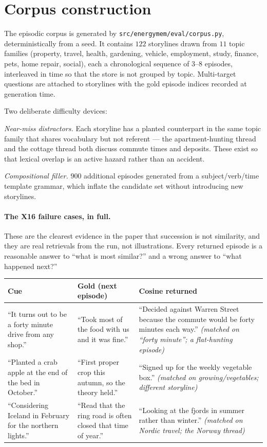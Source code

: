 \section{Corpus construction}
\label{app:corpus}

The episodic corpus is generated by \texttt{src/energymem/eval/corpus.py}, deterministically
from a seed. It contains $122$ storylines drawn from $11$ topic families (property, travel,
health, gardening, vehicle, employment, study, finance, pets, home repair, social), each a
chronological sequence of $3$--$8$ episodes, interleaved in time so that the store is not
grouped by topic. Multi-target questions are attached to storylines with the gold episode
indices recorded at generation time.

Two deliberate difficulty devices:

\emph{Near-miss distractors.} Each storyline has a planted counterpart in the same topic
family that shares vocabulary but not referent --- the apartment-hunting thread and the
cottage thread both discuss commute times and deposits. These exist so that lexical overlap
is an active hazard rather than an accident.

\emph{Compositional filler.} $900$ additional episodes generated from a subject/verb/time
template grammar, which inflate the candidate set without introducing new storylines.

\paragraph{The X16 failure cases, in full.} These are the clearest evidence in the paper that
succession is not similarity, and they are real retrievals from the run, not illustrations.
Every returned episode is a reasonable answer to ``what is most similar?'' and a wrong answer
to ``what happened next?''

\begingroup\small
{}
\label{tab:x16cases}
\centering
\begin{tabular}{@{}p{}p{}p{}@{}}
\toprule
\textbf{Cue} & \textbf{Gold (next episode)} & \textbf{Cosine returned} \\
\midrule
``It turns out to be a forty minute drive from any shop.'' & ``Took most of the food with us and it was fine.'' & ``Decided against Warren Street because the commute would be forty minutes each way.'' \emph{(matched on ``forty minute''; a flat-hunting episode)} \\
``Planted a crab apple at the end of the bed in October.'' & ``First proper crop this autumn, so the theory held.'' & ``Signed up for the weekly vegetable box.'' \emph{(matched on growing/vegetables; different storyline)} \\
``Considering Iceland in February for the northern lights.'' & ``Read that the ring road is often closed that time of year.'' & ``Looking at the fjords in summer rather than winter.'' \emph{(matched on Nordic travel; the Norway thread)} \\
\bottomrule
\end{tabular}
\par\endgroup
\medskip

